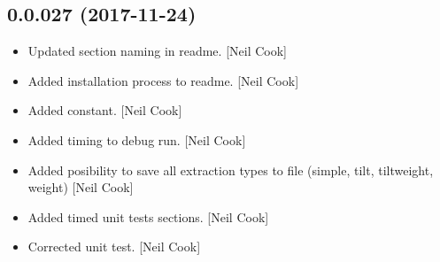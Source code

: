 \documentclass[a4paper,10pt,english]{report}
\begin{document}
\subsection{0.0.027 (2017-11-24)}
\label{\detokenize{misc/changelog:id525}}\begin{itemize}
\item {} 
Updated section naming in readme. {[}Neil Cook{]}

\item {} 
Added installation process to readme. {[}Neil Cook{]}

\item {} 
Added  constant. {[}Neil Cook{]}

\item {} 
Added timing to debug run. {[}Neil Cook{]}

\item {} 
Added posibility to save all extraction types to file (simple, tilt,
tiltweight, weight) {[}Neil Cook{]}

\item {} 
Added timed unit tests sections. {[}Neil Cook{]}

\item {} 
Corrected unit test. {[}Neil Cook{]}

\end{itemize}
\end{document}
